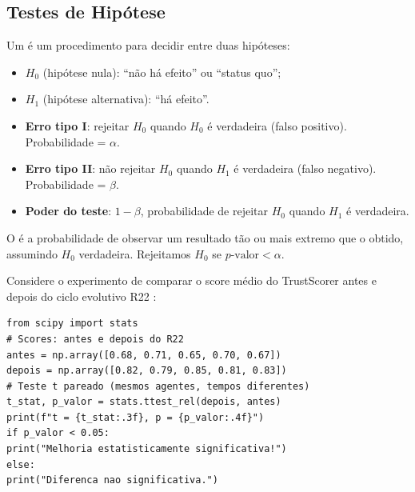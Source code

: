 \subsection{Testes de Hipótese}
\begin{definicao}
Um  é um procedimento para decidir entre
duas hipóteses:
\begin{itemize}
\item $H_0$ (hipótese nula): ``não há efeito'' ou ``status quo'';
\item $H_1$ (hipótese alternativa): ``há efeito''.
\end{itemize}
\end{definicao}
\begin{definicao}
\begin{itemize}
\item \textbf{Erro tipo I}: rejeitar $H_0$ quando $H_0$ é verdadeira
(falso positivo). Probabilidade = $\alpha$.
\item \textbf{Erro tipo II}: não rejeitar $H_0$ quando $H_1$ é
verdadeira (falso negativo). Probabilidade = $\beta$.
\item \textbf{Poder do teste}: $1 - \beta$, probabilidade de rejeitar
$H_0$ quando $H_1$ é verdadeira.
\end{itemize}
\end{definicao}
\begin{definicao}[p-valor]
O  é a probabilidade de observar um resultado tão ou
mais extremo que o obtido, assumindo $H_0$ verdadeira. Rejeitamos $H_0$
se $p\text{-valor} < \alpha$.
\end{definicao}
\begin{exemplo}
Considere o experimento de comparar o score médio do TrustScorer
antes e depois do ciclo evolutivo R22 \cite{opencode2026ecosystem}:
\begin{lstlisting}[style=pythonstyle]
from scipy import stats
# Scores: antes e depois do R22
antes = np.array([0.68, 0.71, 0.65, 0.70, 0.67])
depois = np.array([0.82, 0.79, 0.85, 0.81, 0.83])
# Teste t pareado (mesmos agentes, tempos diferentes)
t_stat, p_valor = stats.ttest_rel(depois, antes)
print(f"t = {t_stat:.3f}, p = {p_valor:.4f}")
if p_valor < 0.05:
print("Melhoria estatisticamente significativa!")
else:
print("Diferenca nao significativa.")
\end{lstlisting}
\end{exemplo}
